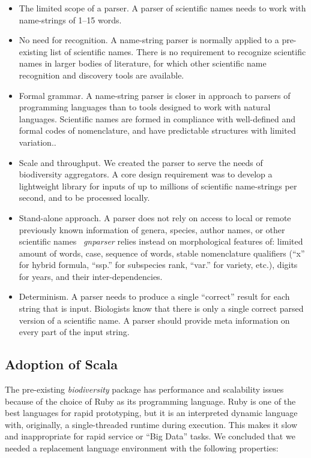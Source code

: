 \documentclass{bmcart}
\begin{document}
\begin{itemize}
  \item The limited scope of a parser. A parser of scientific names needs to work with name-strings of 1--15 words.
  
   \item No need for recognition.  A name-string parser is normally applied to a pre-existing list of scientific names. There is no requirement to recognize scientific names in larger bodies of literature, for which other scientific name recognition and discovery tools are available.

  \item Formal grammar. A name-string parser is closer in approach to parsers of programming languages than to tools designed to work with natural languages. Scientific names are formed in compliance with well-defined and formal codes of nomenclature, and have predictable structures with limited variation..

  \item Scale and throughput. We created the parser to serve the  needs of biodiversity aggregators. A core design requirement was to develop a lightweight library for inputs of up to millions of scientific name-strings per second, and to be processed locally.

  \item Stand-alone approach. A parser does not rely on access to local or remote previously known information of genera, species, author names, or other scientific names \ \textit{gnparser} relies instead on morphological features of: limited amount of words, case, sequence of words, stable nomenclature qualifiers (``x'' for hybrid formula, ``ssp.'' for subspecies rank, ``var.'' for variety, etc.), digits for years, and their inter-dependencies.

  \item Determinism. A parser needs to produce a single ``correct'' result for each string that is input. Biologists know that there is only a single correct parsed version of a scientific name. A parser should provide meta information on every part of the input string.
\end{itemize}

\subsection*{Adoption of Scala}

The pre-existing \textit{biodiversity} package has performance and scalability issues because of the choice of Ruby as its programming language. Ruby is one of the best languages for rapid prototyping, but it is an interpreted dynamic language with, originally, a single-threaded runtime during execution. This makes it slow and inappropriate for rapid service or ``Big Data'' tasks. We concluded that we needed a replacement language environment with the following properties:
\end{document}
